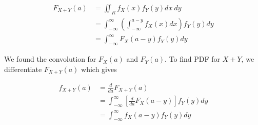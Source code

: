 \begin{align*}
	F_{X+Y}(a)&=\iint_R f_X(x)f_Y(y) dx\:dy \\
	&=\int_{-\infty}^\infty \left( \int_{-\infty}^{a-y} f_X(x) dx \right) f_Y(y) dy \\
	&=\int_{-\infty}^\infty F_X(a-y) f_Y(y) dy
\end{align*}

We found the convolution for $F_X(a)$ and $F_Y(a)$. To find PDF for $X+Y$, we differentiate $F_{X+Y}(a)$ which gives

\begin{align*}
	f_{X+Y}(a)&=\frac{d}{da} F_{X+Y}(a) \\
	&=\int_{-\infty}^\infty \left[ \frac{d}{da}F_X(a-y) \right] f_Y(y) dy \\
	&=\int_{-\infty}^\infty f_X(a-y) f_Y(y) dy
\end{align*}

